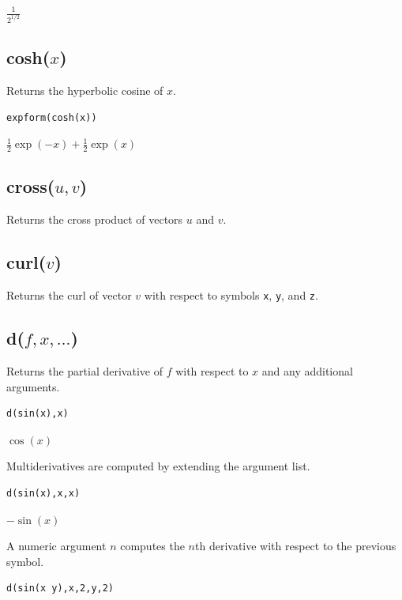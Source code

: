 \documentclass[12pt]{article}
\begin{document}
\noindent
$\displaystyle \frac{1}{2^{1/2}}$

\subsection*{cosh($x$)}

Returns the hyperbolic cosine of $x$.

{\color{blue}
\begin{verbatim}
expform(cosh(x))
\end{verbatim}
}

\noindent
$\tfrac{1}{2}\exp(-x)+\tfrac{1}{2}\exp(x)$

\subsection*{cross($u,v$)}

Returns the cross product of vectors $u$ and $v$.

\subsection*{curl($v$)}

Returns the curl of vector $v$ with respect to symbols \verb$x$, \verb$y$, and \verb$z$.

\subsection*{d($f,x,\ldots$)}

Returns the partial derivative of $f$ with respect to $x$ and any additional arguments.

{\color{blue}
\begin{verbatim}
d(sin(x),x)
\end{verbatim}
}

\noindent
$\cos(x)$

\bigskip
\noindent
Multiderivatives are computed by extending the argument list.

{\color{blue}
\begin{verbatim}
d(sin(x),x,x)
\end{verbatim}
}

\noindent
$-\sin(x)$

\bigskip
\noindent
A numeric argument $n$ computes the $n$th derivative with respect to the previous symbol.

{\color{blue}
\begin{verbatim}
d(sin(x y),x,2,y,2)
\end{verbatim}
}
\end{document}
